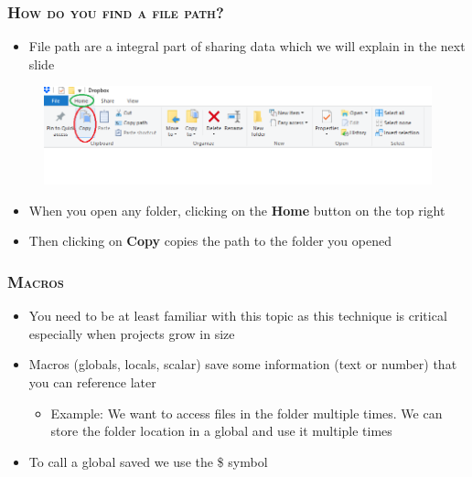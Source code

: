 \documentclass[10pt]{beamer}
\begin{document}
	\begin{frame}
		\frametitle{\textsc{How do you find a file path?}}		
		\begin{itemize}
			\item File path are a integral part of sharing data which we will explain in the next slide
		\end{itemize}
		\begin{figure}[H]
			\centering
			\includegraphics[width=0.9\linewidth]{file_path}
		\end{figure}
		\begin{itemize}
			\item When you open any folder, clicking on the \textbf{Home} button on the top right
			\item Then clicking on \textbf{Copy} copies the path to the folder you opened
		\end{itemize}
	\end{frame}
	
	\begin{frame}
	\frametitle{\textsc{Macros}}

		\begin{itemize}
			\item You need to be at least familiar with this topic as this technique is critical especially when projects grow in size
			\item Macros (globals, locals, scalar) save some information 
				 (text or number) that you can reference later
				\begin{itemize}
					\item Example: We want to access files in the folder 
								   multiple times. We can store the folder 
								   location in a global and use it multiple times
				\end{itemize}
			\item To call a global saved we use the \$ symbol
		\end{itemize}
	\end{frame}	
	
\end{document}
